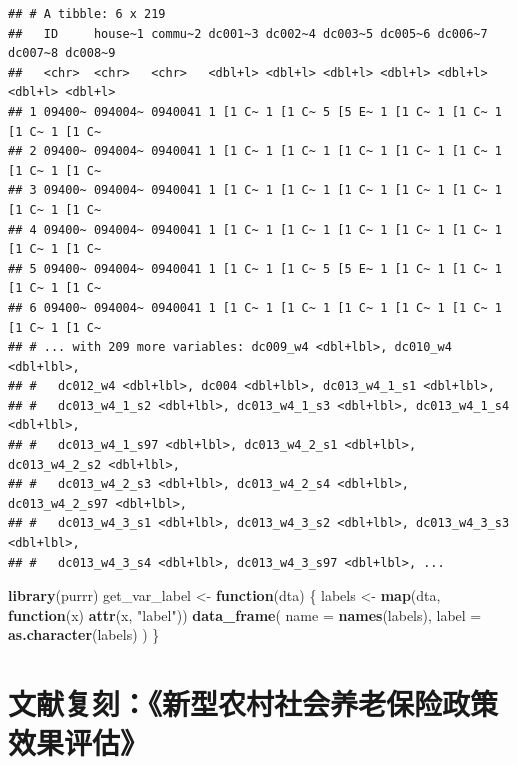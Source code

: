 \documentclass[
]{book}
\newenvironment{Shaded}{\begin{snugshade}}{\end{snugshade}}
\newcommand{\AttributeTok}[1]{\textcolor[rgb]{0.13,0.29,0.53}{#1}}
\newcommand{\ControlFlowTok}[1]{\textcolor[rgb]{0.13,0.29,0.53}{\textbf{#1}}}
\newcommand{\FunctionTok}[1]{\textcolor[rgb]{0.13,0.29,0.53}{\textbf{#1}}}
\newcommand{\NormalTok}[1]{#1}
\newcommand{\OtherTok}[1]{\textcolor[rgb]{0.56,0.35,0.01}{#1}}
\newcommand{\StringTok}[1]{\textcolor[rgb]{0.31,0.60,0.02}{#1}}
\begin{document}
\begin{verbatim}
## # A tibble: 6 x 219
##   ID     house~1 commu~2 dc001~3 dc002~4 dc003~5 dc005~6 dc006~7 dc007~8 dc008~9
##   <chr>  <chr>   <chr>   <dbl+l> <dbl+l> <dbl+l> <dbl+l> <dbl+l> <dbl+l> <dbl+l>
## 1 09400~ 094004~ 0940041 1 [1 C~ 1 [1 C~ 5 [5 E~ 1 [1 C~ 1 [1 C~ 1 [1 C~ 1 [1 C~
## 2 09400~ 094004~ 0940041 1 [1 C~ 1 [1 C~ 1 [1 C~ 1 [1 C~ 1 [1 C~ 1 [1 C~ 1 [1 C~
## 3 09400~ 094004~ 0940041 1 [1 C~ 1 [1 C~ 1 [1 C~ 1 [1 C~ 1 [1 C~ 1 [1 C~ 1 [1 C~
## 4 09400~ 094004~ 0940041 1 [1 C~ 1 [1 C~ 1 [1 C~ 1 [1 C~ 1 [1 C~ 1 [1 C~ 1 [1 C~
## 5 09400~ 094004~ 0940041 1 [1 C~ 1 [1 C~ 5 [5 E~ 1 [1 C~ 1 [1 C~ 1 [1 C~ 1 [1 C~
## 6 09400~ 094004~ 0940041 1 [1 C~ 1 [1 C~ 1 [1 C~ 1 [1 C~ 1 [1 C~ 1 [1 C~ 1 [1 C~
## # ... with 209 more variables: dc009_w4 <dbl+lbl>, dc010_w4 <dbl+lbl>,
## #   dc012_w4 <dbl+lbl>, dc004 <dbl+lbl>, dc013_w4_1_s1 <dbl+lbl>,
## #   dc013_w4_1_s2 <dbl+lbl>, dc013_w4_1_s3 <dbl+lbl>, dc013_w4_1_s4 <dbl+lbl>,
## #   dc013_w4_1_s97 <dbl+lbl>, dc013_w4_2_s1 <dbl+lbl>, dc013_w4_2_s2 <dbl+lbl>,
## #   dc013_w4_2_s3 <dbl+lbl>, dc013_w4_2_s4 <dbl+lbl>, dc013_w4_2_s97 <dbl+lbl>,
## #   dc013_w4_3_s1 <dbl+lbl>, dc013_w4_3_s2 <dbl+lbl>, dc013_w4_3_s3 <dbl+lbl>,
## #   dc013_w4_3_s4 <dbl+lbl>, dc013_w4_3_s97 <dbl+lbl>, ...
\end{verbatim}

\begin{Shaded}
\begin{Highlighting}[]
\FunctionTok{library}\NormalTok{(purrr)}
\NormalTok{get\_var\_label }\OtherTok{\textless{}{-}} \ControlFlowTok{function}\NormalTok{(dta) \{}
\NormalTok{  labels }\OtherTok{\textless{}{-}} \FunctionTok{map}\NormalTok{(dta, }\ControlFlowTok{function}\NormalTok{(x) }\FunctionTok{attr}\NormalTok{(x, }\StringTok{"label"}\NormalTok{))}
  \FunctionTok{data\_frame}\NormalTok{(}
    \AttributeTok{name =} \FunctionTok{names}\NormalTok{(labels),}
    \AttributeTok{label =} \FunctionTok{as.character}\NormalTok{(labels)}
\NormalTok{  )}
\NormalTok{\}}
\end{Highlighting}
\end{Shaded}

\hypertarget{ux6587ux732eux590dux523bux65b0ux578bux519cux6751ux793eux4f1aux517bux8001ux4fddux9669ux653fux7b56ux6548ux679cux8bc4ux4f30}{%
\chapter{文献复刻：《新型农村社会养老保险政策效果评估》}\label{ux6587ux732eux590dux523bux65b0ux578bux519cux6751ux793eux4f1aux517bux8001ux4fddux9669ux653fux7b56ux6548ux679cux8bc4ux4f30}}
\end{document}
